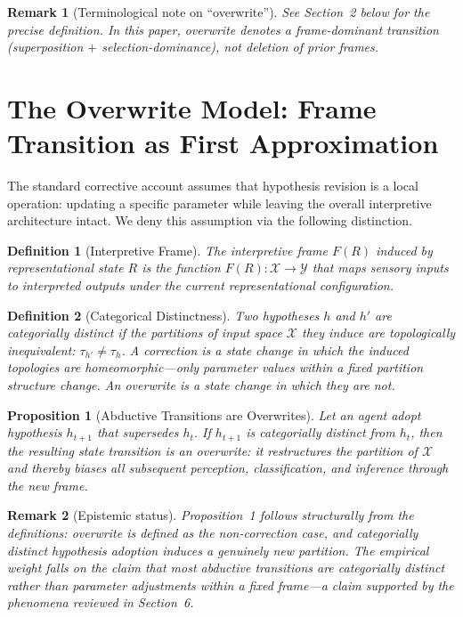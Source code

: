 \documentclass[12pt]{article}
\newtheorem{definition}{Definition}
\newtheorem{proposition}{Proposition}
\newtheorem{remark}{Remark}
\begin{document}

\begin{remark}[Terminological note on ``overwrite'']
See Section~2 below for the precise definition.
In this paper, \emph{overwrite} denotes a frame-dominant transition
(superposition $+$ selection-dominance), not deletion of prior frames.
\end{remark}

\section{The Overwrite Model: Frame Transition as First Approximation}

The standard corrective account assumes that hypothesis revision is
a local operation: updating a specific parameter while leaving the
overall interpretive architecture intact.
We deny this assumption via the following distinction.

\begin{definition}[Interpretive Frame]
The \emph{interpretive frame} $F(R)$ induced by representational
state $R$ is the function $F(R): \mathcal{X} \to \mathcal{Y}$
that maps sensory inputs to interpreted outputs under the current
representational configuration.
\end{definition}

\begin{definition}[Categorical Distinctness]
Two hypotheses $h$ and $h'$ are \emph{categorially distinct} if
the partitions of input space $\mathcal{X}$ they induce are
topologically inequivalent: $\tau_{h'} \neq \tau_h$.
A \emph{correction} is a state change in which the induced topologies
are homeomorphic---only parameter values within a fixed partition
structure change.
An \emph{overwrite} is a state change in which they are not.
\end{definition}

\begin{proposition}[Abductive Transitions are Overwrites]
Let an agent adopt hypothesis $h_{t+1}$ that supersedes $h_t$.
If $h_{t+1}$ is categorially distinct from $h_t$, then the resulting
state transition is an overwrite: it restructures the partition of
$\mathcal{X}$ and thereby biases all subsequent perception,
classification, and inference through the new frame.
\end{proposition}

\begin{remark}[Epistemic status]
Proposition~1 follows structurally from the definitions: overwrite is
defined as the non-correction case, and categorially distinct
hypothesis adoption induces a genuinely new partition.
The empirical weight falls on the claim that most abductive transitions
are categorially distinct rather than parameter adjustments within
a fixed frame---a claim supported by the phenomena reviewed in
Section~6.
\end{remark}
\end{document}
